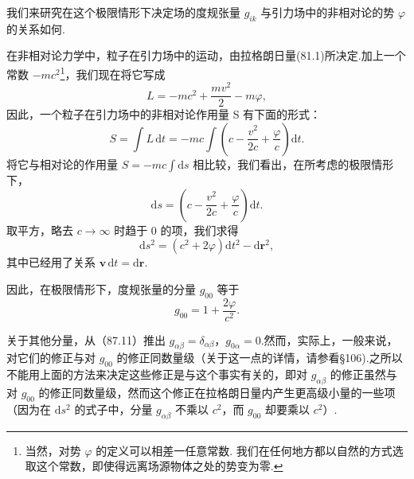 我们来研究在这个极限情形下决定场的度规张量 $g_{ik}$ 与引力场中的非相对论的势 $\varphi$ 的关系如何.

在非相对论力学中，粒子在引力场中的运动，由拉格朗日量(81.1)所决定.加上一个常数 $-mc^2$\footnote{当然，对势 $\varphi$ 的定义可以相差一任意常数. 我们在任何地方都以自然的方式选取这个常数，即使得远离场源物体之处的势变为零.}，我们现在将它写成
\begin{equation}
  L=-mc^2+\frac{mv^2}{2}-m\varphi,
\end{equation}
因此，一个粒子在引力场中的非相对论作用量 S 有下面的形式：
\begin{equation*}
  S=\int L\,\mathrm{d}t
  =-mc\int\left(c-\frac{v^2}{2c}+\frac{\varphi}{c}\right)\mathrm{d}t.
\end{equation*}
将它与相对论的作用量 $S=-mc\int\mathrm{d}s$ 相比较，我们看出，在所考虑的极限情形下，
\begin{equation*}
  \mathrm{d}s=\left(c-\frac{v^2}{2c}+\frac{\varphi}{c}\right)\mathrm{d}t.
\end{equation*}
取平方，略去 $c\to\infty$ 时趋于 0 的项，我们求得
\begin{equation}
  \mathrm{d}s^2=(c^2+2\varphi)\mathrm{d}t^2-\mathrm{d}\boldsymbol{r}^2,
\end{equation}
其中已经用了关系 $\boldsymbol{v}\,\mathrm{d}t=\mathrm{d}\boldsymbol{r}$.

因此，在极限情形下，度规张量的分量 $g_{00}$ 等于
\begin{equation}
  g_{00}=1+\frac{2\varphi}{c^2}.
\end{equation}

关于其他分量，从（87.11）推出 $g_{\alpha\beta}=\delta_{\alpha\beta}$，$g_{0\alpha}=0$.然而，实际上，一般来说，对它们的修正与对 $g_{00}$ 的修正同数量级（关于这一点的详情，请参看§106).之所以不能用上面的方法来决定这些修正是与这个事实有关的，即对 $g_{\alpha\beta}$ 的修正虽然与对 $g_{00}$ 的修正同数量级，然而这个修正在拉格朗日量内产生更高级小量的一些项（因为在 $\mathrm{d}s^2$ 的式子中，分量 $g_{\alpha\beta}$ 不乘以 $c^2$，而 $g_{00}$ 却要乘以 $c^2$）.

